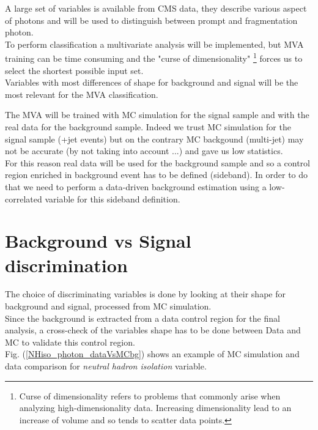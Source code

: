 \label{sec:unchapitre}

A large set of variables is available from CMS data, they describe various aspect of photons and will be used to
distinguish between prompt and fragmentation photon.\\
To perform classification a multivariate analysis will be implemented, but MVA training can be time consuming and the "curse of
dimensionality" \footnote{Curse of dimensionality refers to problems that commonly arise when analyzing high-dimensionality data.
Increasing dimensionality lead to an increase of volume and so tends to scatter data points.} forces us to select the shortest possible input set.\\

Variables with most differences of shape for background and signal will be the most relevant for the MVA classification.



The MVA will be trained with MC simulation for the signal sample and with the real data for the background sample. Indeed we trust MC simulation for the signal sample (\textgamma+jet events) but on the contrary MC backgound (multi-jet) may not be accurate (by not taking into account ...) and gave us low statistics.\\
For this reason real data will be used for the background sample and so a control region enriched in background event has to be defined (sideband).
In order to do that we need to perform a data-driven background estimation using a low-correlated variable for this sideband definition.

\section{Background vs Signal discrimination}

The choice of discriminating variables is done by looking at their shape for background and signal, processed from MC simulation.\\
Since the background is extracted from a data control region for the final analysis, a cross-check of the variables shape has to be done between Data and MC to validate this control region.\\
Fig. (\ref{NHiso_photon_dataVsMCbg}) shows an example of MC simulation and data comparison for \emph{neutral hadron isolation} variable. \\

